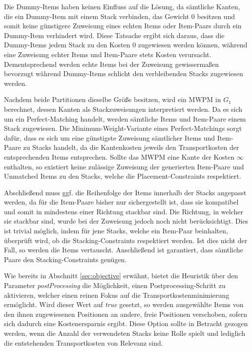 Die Dummy-Items haben keinen Einfluss auf die Lösung, da sämtliche Kanten, die ein Dummy-Item mit einem Stack verbinden,
das Gewicht $0$ besitzen und somit keine günstigere Zuweisung eines echten Items oder Item-Paars durch ein Dummy-Item
verhindert wird. Diese Tatsache ergibt sich daraus, dass die Dummy-Items jedem Stack zu den Kosten $0$ zugewiesen
werden können, während eine Zuweisung echter Items und Item-Paare stets Kosten verursacht. Dementsprechend werden
echte Items bei der Zuweisung gewissermaßen bevorzugt während Dummy-Items schlicht den verbleibenden Stacks zugewiesen werden.

Nachdem beide Partitionen dieselbe Größe besitzen, wird ein \textsc{MWPM} in $G_1$ berechnet, dessen Kanten als
Stackzuweisungen interpretiert werden. Da es sich um ein Perfect-Matching handelt, werden sämtliche Items und Item-Paare einem Stack zugewiesen. Die Minimum-Weight-Variante eines Perfect-Matchings sorgt dafür, dass es sich um eine günstigste Zuweisung sämtlicher Items und Item-Paare zu Stacks handelt, da die Kantenkosten jeweils den Transportkosten der entsprechenden Items entsprechen. Sollte das \textsc{MWPM} eine Kante der Kosten $\infty$ enthalten, so existiert keine zulässige Zuweisung der generierten Item-Paare und Unmatched Items zu den Stacks, welche die Placement-Constraints respektiert.

Abschließend muss ggf. die Reihenfolge der Items innerhalb der Stacks angepasst werden, da für die Item-Paare bisher nur sichergestellt ist, dass sie kompatibel und somit in mindestens einer Richtung stackbar sind. Die Richtung, in welcher sie stackbar sind, wurde bei der Zuweisung jedoch noch nicht berücksichtigt. Dies ist trivial möglich, indem für jene Stacks, welche ein Item-Paar beinhalten, überprüft wird, ob die Stacking-Constraints respektiert werden. Ist dies nicht der Fall, so werden die Items vertauscht. Anschließend ist garantiert, dass sämtliche Paare den Stacking-Constraints genügen.

Wie bereits in Abschnitt \ref{sec:objective} erwähnt, bietet die Heuristik über den Parameter
\textit{postProcessing} die Möglichkeit, einen Postprocessing-Schritt zu aktivieren, welcher einen reinen Fokus
auf die Transportkostenminimierung ermöglicht. Wird dieser Wert auf \textit{true} gesetzt, so werden
ausgewählte Items von den ihnen zugewiesenen Positionen an andere, freie Positionen verschoben,
sofern sich dadurch eine Kostenersparnis ergibt. Diese Option sollte in Betracht gezogen werden,
wenn die Anzahl der verwendeten Stacks keine Rolle spielt und lediglich die entstehenden Transportkosten
von Relevanz sind.


